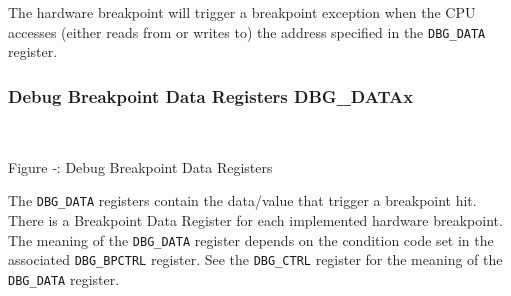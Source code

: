 The hardware breakpoint will trigger a breakpoint exception when the CPU
accesses (either reads from or writes to) the address specified in the
\texttt{DBG\_DATA} register.

\subsubsection{Debug Breakpoint Data Registers
DBG\_DATAx}\label{debug-breakpoint-data-registers-dbg_datax} ~\\

\missingfigure{}

Figure ‑: Debug Breakpoint Data Registers

The \texttt{DBG\_DATA} registers contain the data/value that trigger a breakpoint
hit. There is a Breakpoint Data Register for each implemented hardware
breakpoint. The meaning of the \texttt{DBG\_DATA} register depends on the
condition code set in the associated \texttt{DBG\_BPCTRL} register. See the
\texttt{DBG\_CTRL} register for the meaning of the \texttt{DBG\_DATA} register.
